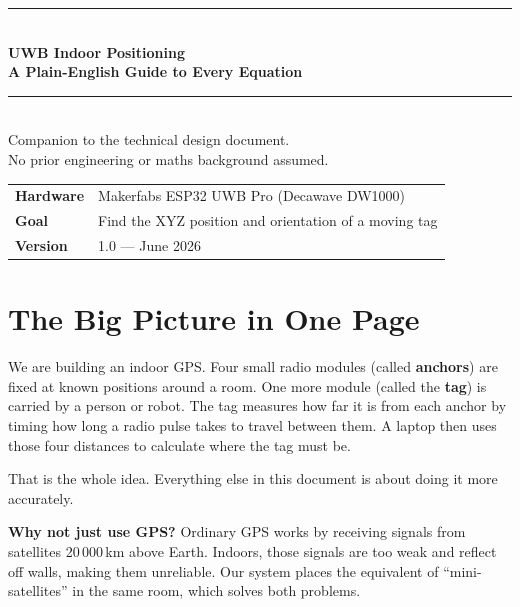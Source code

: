 \documentclass[11pt,a4paper]{article}
\begin{document}

\begin{titlepage}
  \centering\vspace*{2cm}
  {\color{dkblue}\rule{\linewidth}{2pt}}\\[0.5cm]
  {\huge\bfseries UWB Indoor Positioning\\[0.3cm]
   \Large A Plain-English Guide to Every Equation}\\[0.4cm]
  {\color{dkblue}\rule{\linewidth}{2pt}}\\[1cm]
  {\large Companion to the technical design document.\\[0.3cm]
   No prior engineering or maths background assumed.}\\[2cm]
  \begin{tabular}{ll}
    \textbf{Hardware} & Makerfabs ESP32 UWB Pro (Decawave DW1000) \\
    \textbf{Goal}     & Find the XYZ position and orientation of a moving tag \\
    \textbf{Version}  & 1.0 --- June 2026 \\
  \end{tabular}
  \vfill
\end{titlepage}

\tableofcontents
\newpage

\section{The Big Picture in One Page}

\begin{plain}
We are building an indoor GPS. Four small radio modules (called \textbf{anchors}) are fixed at known positions around a room. One more module (called the \textbf{tag}) is carried by a person or robot. The tag measures how far it is from each anchor by timing how long a radio pulse takes to travel between them. A laptop then uses those four distances to calculate where the tag must be.

That is the whole idea. Everything else in this document is about doing it more accurately.
\end{plain}

\textbf{Why not just use GPS?} Ordinary GPS works by receiving signals from satellites 20\,000\,km above Earth. Indoors, those signals are too weak and reflect off walls, making them unreliable. Our system places the equivalent of ``mini-satellites'' in the same room, which solves both problems.
\end{document}
